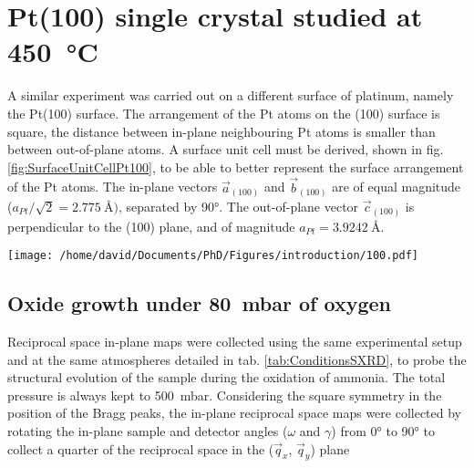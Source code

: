 \newpage
\section{Pt(100) single crystal studied at \qty{450}{\degreeCelsius}} \label{sec:SXRD100}


A similar experiment was carried out on a different surface of platinum, namely the Pt(100) surface.
The arrangement of the Pt atoms on the (100) surface is square, the distance between in-plane neighbouring Pt atoms is smaller than between out-of-plane atoms.
A surface unit cell must be derived, shown in fig. \ref{fig:SurfaceUnitCellPt100}, to be able to better represent the surface arrangement of the Pt atoms.
The in-plane vectors $\vec{a}_{(100)}$ and $\vec{b}_{(100)}$ are of equal magnitude ($a_{Pt} / \sqrt{2} = \qty{2.775}{\angstrom})$, separated by \ang{90}.
The out-of-plane vector $\vec{c}_{(100)}$ is perpendicular to the (100) plane, and of magnitude $a_{Pt} = \qty{3.9242}{\angstrom}$.

\begin{SCfigure}
    \centering
    \texttt{[image: /home/david/Documents/PhD/Figures/introduction/100.pdf]}
    \caption{
        Face-entered cubic unit cell of Pt with $(100)$ crystallographic plane drawn in green.
        $\vec{a}_{(100)}$, $\vec{b}_{(100)}$ and $\vec{c}_{(100)}$ are the $(100)$ surface unit cell vectors.
    }
    \label{fig:SurfaceUnitCellPt100}
\end{SCfigure}

\subsection{Oxide growth under \qty{80}{\milli\bar} of oxygen}

Reciprocal space in-plane maps were collected using the same experimental setup and at the same atmospheres detailed in tab. \ref{tab:ConditionsSXRD}, to probe the structural evolution of the sample during the oxidation of ammonia.
The total pressure is always kept to \qty{500}{\milli\bar}.
Considering the square symmetry in the position of the Bragg peaks, the in-plane reciprocal space maps were collected by rotating the in-plane sample and detector angles ($\omega$ and $\gamma$) from \ang{0} to \ang{90} to collect a quarter of the reciprocal space in the ($\vec{q}_x$, $\vec{q}_y$) plane

